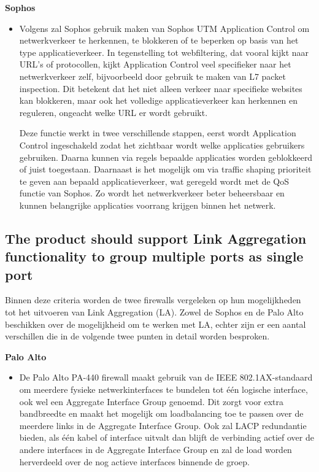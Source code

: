 \textbf{Sophos}
\begin{itemize}[label=\textbullet]
    \item Volgens \textcite{SophosTS2025} zal Sophos gebruik maken van Sophos UTM Application Control om netwerkverkeer te herkennen, te blokkeren of te beperken op basis van het type applicatieverkeer. In tegenstelling tot webfiltering, dat vooral kijkt naar URL’s of protocollen, kijkt Application Control veel specifieker naar het netwerkverkeer zelf, bijvoorbeeld door gebruik te maken van L7 packet inspection. Dit betekent dat het niet alleen verkeer naar specifieke websites kan blokkeren, maar ook het volledige applicatieverkeer kan herkennen en reguleren, ongeacht welke URL er wordt gebruikt.
    
    Deze functie werkt in twee verschillende stappen, eerst wordt Application Control ingeschakeld zodat het zichtbaar wordt welke applicaties gebruikers gebruiken. Daarna kunnen via regels bepaalde applicaties worden geblokkeerd of juist toegestaan. Daarnaast is het mogelijk om via traffic shaping prioriteit te geven aan bepaald applicatieverkeer, wat geregeld wordt met de QoS functie van Sophos. Zo wordt het netwerkverkeer beter beheersbaar en kunnen belangrijke applicaties voorrang krijgen binnen het netwerk.
\end{itemize}






\subsection{The product should support Link Aggregation functionality to group multiple ports as single port}

Binnen deze criteria worden de twee firewalls vergeleken op hun mogelijkheden tot het uitvoeren van Link Aggregation (LA). Zowel de Sophos en de Palo Alto beschikken over de mogelijkheid om te werken met LA, echter zijn er een aantal verschillen die in de volgende twee punten in detail worden besproken.

\textbf{Palo Alto}
\begin{itemize}[label=\textbullet]
    \item De Palo Alto PA-440 firewall maakt gebruik van de IEEE 802.1AX-standaard om meerdere fysieke netwerkinterfaces te bundelen tot één logische interface, ook wel een Aggregate Interface Group genoemd. Dit zorgt voor extra bandbreedte en maakt het mogelijk om loadbalancing toe te passen over de meerdere links in de Aggregate Interface Group. Ook zal LACP redundantie bieden, als één kabel of interface uitvalt dan blijft de verbinding actief over de andere interfaces in de Aggregate Interface Group en zal de load worden herverdeeld over de nog actieve interfaces binnende de groep.
\end{itemize}

